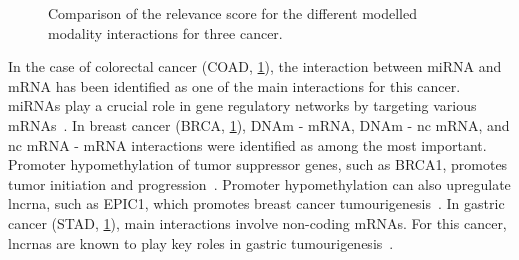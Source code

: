 \documentclass[../main.tex]{subfiles}
\begin{document}
\begin{figure}
	        \caption[Comparison of the  relevance scores]{Comparison of the  relevance score for the different modelled modality interactions for three cancer.}\label{fig:LRP_CrossAttOmics_subset}
	    \end{figure}
	    In the case of colorectal cancer (COAD, \cref{fig:LRP_CrossAttOmics_subset}),  the interaction between miRNA and mRNA has been identified as one of the main interactions for this cancer.
	    miRNAs play a crucial role in gene regulatory networks by targeting various mRNAs~\cite{Amirkhah2015}.
	    In breast cancer (BRCA, \cref{fig:LRP_CrossAttOmics_subset}), DNAm - mRNA, DNAm - nc mRNA, and nc mRNA - mRNA interactions were identified as among the most important.
	    Promoter hypomethylation of tumor suppressor genes, such as BRCA1, promotes tumor initiation and progression~\cite{Szyf2004}.
	    Promoter hypomethylation can also upregulate \gls{lncrna}, such as EPIC1, which promotes breast cancer tumourigenesis~\cite{Wang2018}.
	    In gastric cancer (STAD, \cref{fig:LRP_CrossAttOmics_subset}), main interactions involve non-coding mRNAs.
	    For this cancer, \glspl{lncrna} are known to play key roles in gastric tumourigenesis~\cite{Tan2020}.
\end{document}

